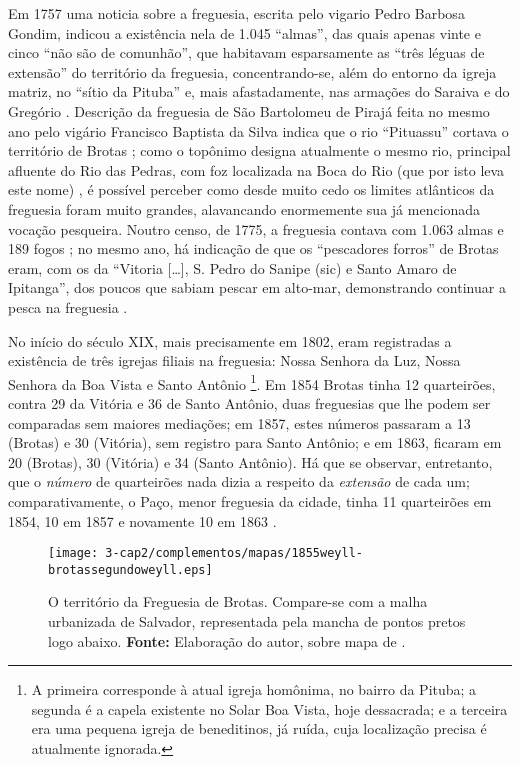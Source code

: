 Em 1757 uma noticia sobre a freguesia, escrita pelo vigario Pedro Barbosa Gondim, indicou a existência nela de 1.045 ``almas'', das quais apenas vinte e cinco ``não são de comunhão'', que habitavam esparsamente as ``três léguas de extensão'' do território da freguesia, concentrando-se, além do entorno da igreja matriz, no ``sítio da Pituba'' e, mais afastadamente, nas armações do Saraiva e do Gregório \cite[p.~183]{castralmeida_ultramar_1908}. Descrição da freguesia de São Bartolomeu de Pirajá feita no mesmo ano pelo vigário Francisco Baptista da Silva indica que o rio ``Pituassu'' cortava o território de Brotas \cite[p.~218]{castralmeida_ultramar_1908}; como o topônimo designa atualmente o mesmo rio, principal afluente do Rio das Pedras, com foz localizada na Boca do Rio (que por isto leva este nome) \cite[p.~175-177]{santos_aguas_2010}, é possível perceber como desde muito cedo os limites atlânticos da freguesia foram muito grandes, alavancando enormemente sua já mencionada vocação pesqueira. Noutro censo, de 1775, a freguesia contava com 1.063 almas e 189 fogos \cite[p.~183]{castralmeida_ultramar_1910}; no mesmo ano, há indicação de que os ``pescadores forros'' de Brotas eram, com os da ``Vitoria [\dots], S. Pedro do Sanipe (sic) e Santo Amaro de Ipitanga'', dos poucos que sabiam pescar em alto-mar, demonstrando continuar a pesca na freguesia \cite[p.~294]{castralmeida_ultramar_1910}.

No início do século XIX, mais precisamente em 1802, eram registradas a existência de três igrejas filiais na freguesia: Nossa Senhora da Luz, Nossa Senhora da Boa Vista e Santo Antônio \cite[p.~172]{VASCONCELOS2002}\footnote{A primeira corresponde à atual igreja homônima, no bairro da Pituba; a segunda é a capela existente no Solar Boa Vista, hoje dessacrada; e a terceira era uma pequena igreja de beneditinos, já ruída, cuja localização precisa é atualmente ignorada.}. Em 1854 Brotas tinha 12 quarteirões, contra 29 da Vitória e 36 de Santo Antônio, duas freguesias que lhe podem ser comparadas sem maiores mediações; em 1857, estes números passaram a 13 (Brotas) e 30 (Vitória), sem registro para Santo Antônio; e em 1863, ficaram em 20 (Brotas), 30 (Vitória) e 34 (Santo Antônio). Há que se observar, entretanto, que o \textit{número} de quarteirões nada dizia a respeito da \textit{extensão} de cada um; comparativamente, o Paço, menor freguesia da cidade, tinha 11 quarteirões em 1854, 10 em 1857 e novamente 10 em 1863 \cite[p.~46]{NASCIMENTO2007}.

\begin{figure}[!htp]
\centering
\texttt{[image: 3-cap2/complementos/mapas/1855weyll-brotassegundoweyll.eps]} 
\caption{O território da Freguesia de Brotas. Compare-se com a malha urbanizada de Salvador, representada pela mancha de pontos pretos logo abaixo. \textbf{Fonte:} Elaboração do autor, sobre mapa de .}
\end{figure}


